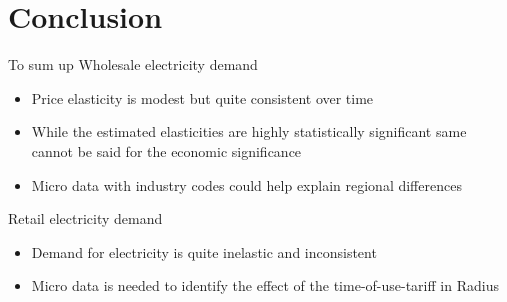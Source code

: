 \section{Conclusion}

\begin{frame}{To sum up}
Wholesale electricity demand
\begin{itemize}
    \item Price elasticity is modest but quite consistent over time
    \item While the estimated elasticities are highly statistically significant same cannot be said for the economic significance
    \item Micro data with industry codes could help explain regional differences
\end{itemize}
Retail electricity demand
\begin{itemize}
    \item Demand for electricity is quite inelastic and inconsistent
    \item Micro data is needed to identify the effect of the time-of-use-tariff in Radius
\end{itemize}
\end{frame}



